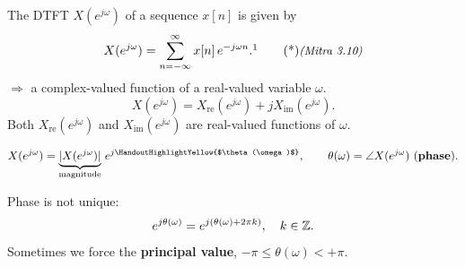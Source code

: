 \documentclass[handout_subfiles_root.tex]{subfiles}
\begin{document}
\maketitle


\begin{defbox}[title={Def}]
The DTFT $X(e^{j\omega})$ of a sequence $x[n]$ is given by
\begin{equation}
X(e^{j\omega}) = \sum_{n=-\infty}^{\infty} x[n]\,e^{-j\omega n}.\footnotemark{}\MitraTagRef{3.10}
\end{equation}
$\Rightarrow$ a complex-valued function of a real-valued variable $\omega$.
\begin{equation}
X(e^{j\omega}) = X_{\mathrm{re}}(e^{j\omega}) + j X_{\mathrm{im}}(e^{j\omega}).
\end{equation}
Both $X_{\mathrm{re}}(e^{j\omega})$ and $X_{\mathrm{im}}(e^{j\omega})$ are real-valued functions of $\omega$.
\end{defbox}

\begin{equation}
X(e^{j\omega}) = \underbrace{|X(e^{j\omega})|}_{\HandoutUnderbraceLabel{\text{magnitude}}}\,e^{j\HandoutHighlightYellow{$\theta(\omega)$}}, \qquad \theta(\omega) = \angle X(e^{j\omega})\ \text{(\textbf{phase})}.
\end{equation}

\begin{notebox}
Phase is not unique:
\begin{equation*}
  e^{j\theta(\omega)} = e^{j(\theta(\omega)+2\pi k)}, \quad k \in \mathbb{Z}.
\end{equation*}
\noindent Sometimes we force the \textbf{principal value},
$-\pi \le \theta(\omega) < +\pi$.
\end{notebox}
\end{document}
